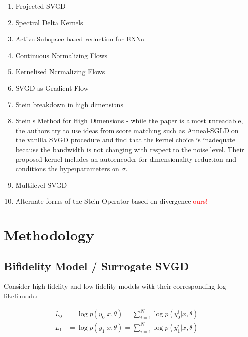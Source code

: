 \documentclass[12pt]{article}
\renewcommand{\[}{\left[}
\renewcommand{\]}{\right]}
\renewcommand{\(}{\left(}
\renewcommand{\)}{\right)}
\begin{document}
\begin{enumerate}
    \item Projected SVGD \cite{chen_projected_2020}

    \item Spectral Delta Kernels \cite{lazaro-gredilla_sparse_2010}

    \item Active Subspace based reduction for BNNs \cite{jantre_learning_2023}

    \item Continuous Normalizing Flows \cite{grathwohl_ffjord_2018}

    \item Kernelized Normalizing Flows \cite{english_kernelised_2024}

    \item SVGD as Gradient Flow \cite{liu_stein_2017}

    \item Stein breakdown in high dimensions \cite{ba_towards_2019}

    \item Stein's Method for High Dimensions \cite{chang_kernel_2020} - while the paper is almost unreadable, the authors try to use ideas from score matching such as Anneal-SGLD on the vanilla SVGD procedure and find that the kernel choice is inadequate because the bandwidth is not changing with respect to the noise level. Their proposed kernel includes an autoencoder for dimensionality reduction and conditions the hyperparameters on $\sigma$.

    \item Multilevel SVGD \cite{alsup_multilevel_2022}


    \item Alternate forms of the Stein Operator based on divergence \textcolor{red}{ours!}
\end{enumerate}

\section{Methodology}

\subsection{Bifidelity Model / Surrogate SVGD}

Consider high-fidelity and low-fidelity models with their corresponding log-likelihoods:

\begin{align}
 L_0 &= \log p(y_0 | x, \theta) = \sum_{i=1}^{N} \log p(y_0^i | x, \theta) \\
 L_1 &= \log p(y_1 | x, \theta) = \sum_{i=1}^{N} \log p(y_1^i | x, \theta)
\end{align}
\end{document}
